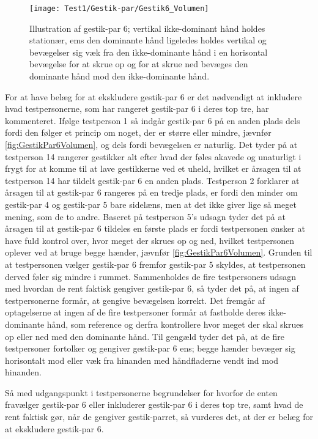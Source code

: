 %
\begin{figure}[H]
	\centering
	\texttt{[image: Test1/Gestik-par/Gestik6\_Volumen]}
	\caption{Illustration af gestik-par 6; vertikal ikke-dominant hånd holdes stationær, ems den dominante hånd ligeledes holdes vertikal og bevægelser sig væk fra den ikke-dominante hånd i en horisontal bevægelse for at skrue op og for at skrue ned bevæges den dominante hånd mod den ikke-dominante hånd.}
	\label{fig:GestikPar6Volumen}
\end{figure}
\noindent
% 
For at have belæg for at ekskludere gestik-par 6 er det nødvendigt at inkludere hvad testpersonerne, som har rangeret gestik-par 6 i deres top tre, har kommenteret. Ifølge testperson 1 så indgår gestik-par 6 på en anden plads dels fordi den følger et princip om noget, der er større eller mindre, jævnfør \autoref{fig:GestikPar6Volumen}, og dels fordi bevægelsen er naturlig. Det tyder på at testperson 14 rangerer gestikker alt efter hvad der føles akavede og unaturligt i frygt for at komme til at lave gestikkerne ved et uheld, hvilket er årsagen til at testperson 14 har tildelt gestik-par 6 en anden plads. Testperson 2 forklarer at årsagen til at gestik-par 6 rangeres på en tredje plads, er fordi den minder om gestik-par 4 og gestik-par 5 bare sidelæns, men at det ikke giver lige så meget mening, som de to andre. Baseret på testperson 5's udsagn tyder det på at årsagen til at gestik-par 6 tildeles en første plads er fordi testpersonen ønsker at have fuld kontrol over, hvor meget der skrues op og ned, hvilket testpersonen oplever ved at bruge begge hænder, jævnfør \autoref{fig:GestikPar6Volumen}. Grunden til at testpersonen vælger gestik-par 6 fremfor gestik-par 5 skyldes, at testpersonen derved føler sig mindre i rummet. Sammenholdes de fire testpersoners udsagn med hvordan de rent faktisk gengiver gestik-par 6, så tyder det på, at ingen af testpersonerne formår, at gengive bevægelsen korrekt. Det fremgår af optagelserne at ingen af de fire testpersoner formår at fastholde deres ikke-dominante hånd, som reference og derfra kontrollere hvor meget der skal skrues op eller ned med den dominante hånd. Til gengæld tyder det på, at de fire testpersoner fortolker og gengiver gestik-par 6 ens; begge hænder bevæger sig horisontalt mod eller væk fra hinanden med håndfladerne vendt ind mod hinanden. 

Så med udgangspunkt i testpersonerne begrundelser for hvorfor de enten fravælger gestik-par 6 eller inkluderer gestik-par 6 i deres top tre, samt hvad de rent faktisk gør, når de gengiver gestik-parret, så vurderes det, at der er belæg for at ekskludere gestik-par 6.  





